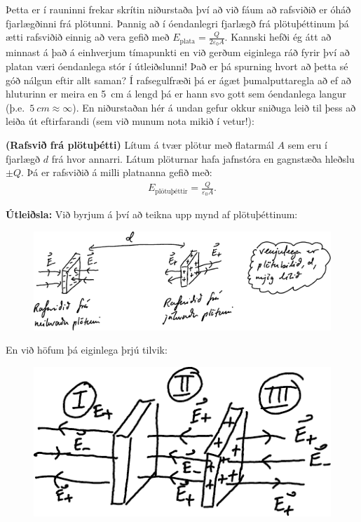 \ifdefined \wholebook \else\documentclass[oneside]{book}\usepackage{EdlBook}\graphicspath{{figures/}}
\begin{document}
Þetta er í rauninni frekar skrítin niðurstaða því að við fáum að rafsviðið er óháð fjarlægðinni frá plötunni. Þannig að í óendanlegri fjarlægð frá plötuþéttinum þá ætti rafsviðið einnig að vera gefið með $E_{\text{plata}} = \frac{Q}{2\varepsilon_0 A}$. Kannski hefði ég átt að minnast á það á einhverjum tímapunkti en við gerðum eiginlega ráð fyrir því að platan væri óendanlega stór í útleiðslunni! Það er þá spurning hvort að þetta sé góð nálgun eftir allt saman? Í rafsegulfræði þá er ágæt þumalputtaregla að ef að hluturinn er meira en \SI{5}{cm} á lengd þá er hann svo gott sem óendanlega langur (þ.e.~$\SI{5}{cm} \approx \infty$). En niðurstaðan hér á undan gefur okkur sniðuga leið til þess að leiða út eftirfarandi (sem við munum nota mikið í vetur!):

\newpage

\begin{tcolorbox}
\begin{theorem}
\textbf{(Rafsvið frá plötuþétti)} Lítum á tvær plötur með flatarmál $A$ sem eru í fjarlægð $d$ frá hvor annarri. Látum plöturnar hafa jafnstóra en gagnstæða hleðslu $\pm Q$. Þá er rafsviðið á milli platnanna gefið með:
\begin{align*}
    E_{\text{plötuþéttir}} = \frac{Q}{\varepsilon_0 A}.
\end{align*}
\end{theorem}
\end{tcolorbox}

\textbf{Útleiðsla:} Við byrjum á því að teikna upp mynd af plötuþéttinum:

\begin{figure}[ht!]
    \centering
    \includegraphics{figures/rafsvidid-plata.pdf}
\end{figure}

En við höfum þá eiginlega þrjú tilvik:

\begin{figure}[ht!]
    \centering
    \includegraphics{figures/tilvik.pdf}
\end{figure}
\end{document}
